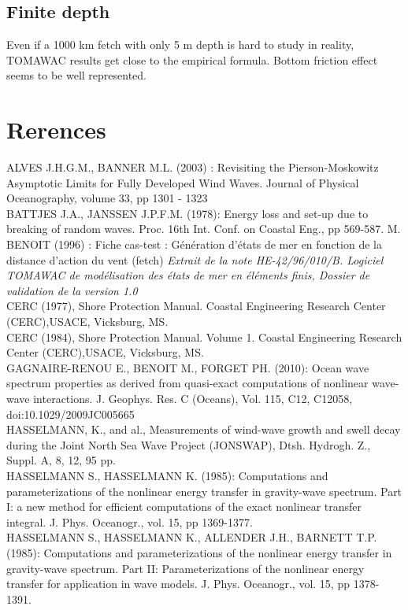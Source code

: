 \documentclass[10pt]{article}
\begin{document}
\subsection*{Finite depth}
Even if a 1000 km fetch with only 5 m depth is hard to study in reality,
TOMAWAC results get close to the empirical formula. Bottom friction effect
seems to be well represented.
\section*{Rerences}

ALVES J.H.G.M., BANNER M.L. (2003) : Revisiting the Pierson-Moskowitz
Asymptotic Limits for Fully Developed Wind Waves. Journal of Physical
Oceanography, volume 33, pp 1301 - 1323\\
BATTJES J.A., JANSSEN J.P.F.M. (1978): Energy loss and set-up due to breaking
of random waves. Proc.
16th Int. Conf. on Coastal Eng., pp 569-587.
M. BENOIT (1996) : Fiche cas-test : G\'en\'eration d'\'etats de mer en
fonction de la distance d'action du vent (fetch) \textit{Extrait de la note
  HE-42/96/010/B. Logiciel TOMAWAC de mod\'elisation des \'etats de mer en
  \'el\'ements finis, Dossier de validation de la version 1.0} \\
CERC (1977), Shore Protection Manual. Coastal Engineering Research Center
(CERC),USACE, Vicksburg, MS.\\
CERC (1984), Shore Protection Manual. Volume 1. Coastal Engineering Research
Center (CERC),USACE, Vicksburg, MS.\\
GAGNAIRE-RENOU E., BENOIT M., FORGET PH. (2010): Ocean wave spectrum properties
as derived
from quasi-exact computations of nonlinear wave-wave interactions. J. Geophys.
Res. C (Oceans),
Vol. 115, C12, C12058, doi:10.1029/2009JC005665\\
HASSELMANN, K., and al., Measurements of wind-wave growth and swell decay
during the Joint North Sea Wave Project (JONSWAP), Dtsh. Hydrogh. Z., Suppl.
A, 8, 12, 95 pp.\\
HASSELMANN S., HASSELMANN K. (1985): Computations and parameterizations of the
nonlinear energy
transfer in gravity-wave spectrum. Part I: a new method for efficient
computations of the exact nonlinear
transfer integral. J. Phys. Oceanogr., vol. 15, pp 1369-1377.\\
HASSELMANN S., HASSELMANN K., ALLENDER J.H., BARNETT T.P. (1985): Computations
and parameterizations of the nonlinear energy transfer in gravity-wave
spectrum. Part II: Parameterizations of the nonlinear energy transfer for
application in wave models. J. Phys. Oceanogr., vol. 15, pp 1378-1391.\\
\end{document}
